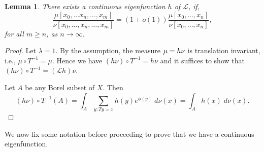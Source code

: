 \documentclass[11pt, a4paper]{amsart}
\newtheorem{lem}[thm]{Lemma}
\theoremstyle{definition}
\theoremstyle{remark}
\def\X{X}
\begin{document}
\begin{lem}
  There exists a continuous eigenfunction $h$ of ${\mathcal L}$, if, 
$$\frac{\mu[x_0,\ldots x_n, \ldots, x_m]}{\nu[x_0,\ldots, x_n, \ldots, x_m]}=(1+o(1)) \frac{\mu[x_0,\ldots, x_n]}{\nu[x_0, \ldots, x_n]},$$
for all $m\geq n$, as $n\to \infty$.
\end{lem}
\begin{proof}
  Let $\lambda=1$. By the assumption, the measure $\mu= h \nu$ is translation
  invariant, i.e., $\mu\circ T^{-1}=\mu$. Hence we have $(h\nu)\circ
  T^{-1}=h\nu$ and it suffices to show that $(h\nu)\circ T^{-1}=({\mathcal
    L}h)\nu$.

  Let $A$ be any Borel subset of $\X$. Then
  $$(h\nu)\circ T^{-1} (A)=\int_A \sum_{y: Ty=x} h(y)e^{\phi(y)}\; d\nu(x)=\int_A h(x)\; d\nu(x).$$
\end{proof}

\noindent
We now fix some notation before proceeding to prove that we have a continuous eigenfunction.
\newline
\end{document}
